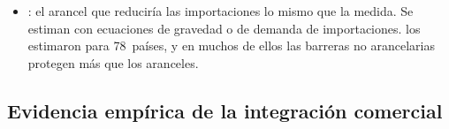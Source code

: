 \documentclass[11pt]{article}
\begin{document}
\begin{itemize}
\item {}: el arancel que reduciría las importaciones lo mismo que la medida. Se estiman con ecuaciones de gravedad o de demanda de importaciones. \textcite{KeeNicitaOlarreaga2009Estimating} los estimaron para 78~países, y en muchos de ellos las barreras no arancelarias protegen más que los aranceles.
\end{itemize}

\subsection{Evidencia empírica de la integración comercial}\label{sec:evidencia}
\end{document}
